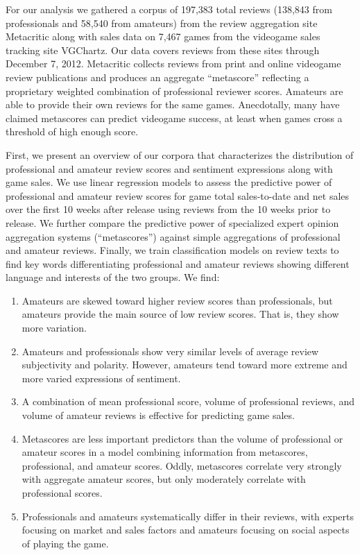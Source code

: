 \documentclass[letterpaper]{article}
\begin{document}
For our analysis we gathered a corpus of 197,383 total reviews (138,843 from professionals and 58,540 from amateurs) from the review aggregation site Metacritic along with sales data on 7,467 games from the videogame sales tracking site VGChartz. Our data covers reviews from these sites through December 7, 2012. Metacritic collects reviews from print and online videogame review publications and produces an aggregate ``metascore'' reflecting a proprietary weighted combination of professional reviewer scores. Amateurs are able to provide their own reviews for the same games. Anecdotally, many have claimed metascores can predict videogame success, at least when games cross a threshold of high enough score. 

First, we present an overview of our corpora that characterizes the distribution of professional and amateur review scores and sentiment expressions along with game sales. We use linear regression models to assess the predictive power of professional and amateur review scores for game total sales-to-date and net sales over the first 10 weeks after release using reviews from the 10 weeks prior to release. We further compare the predictive power of specialized expert opinion aggregation systems (``metascores'') against simple aggregations of professional and amateur reviews. Finally, we train classification models on review texts to find key words differentiating professional and amateur reviews showing different language and interests of the two groups. We find:
\begin{enumerate}
\item Amateurs are skewed toward higher review scores than professionals, but amateurs provide the main source of low review scores. That is, they show more variation.
\item Amateurs and professionals show very similar levels of average review subjectivity and polarity. However, amateurs tend toward more extreme and more varied expressions of sentiment.
\item A combination of mean professional score, volume of professional reviews, and volume of amateur reviews is effective for predicting game sales.
\item Metascores are less important predictors than the volume of professional or amateur scores in a model combining information from metascores, professional, and amateur scores. Oddly, metascores correlate very strongly with aggregate amateur scores, but only moderately correlate with professional scores.
\item Professionals and amateurs systematically differ in their reviews, with experts focusing on market and sales factors and amateurs focusing on social aspects of playing the game.
\end{enumerate}
\end{document}
